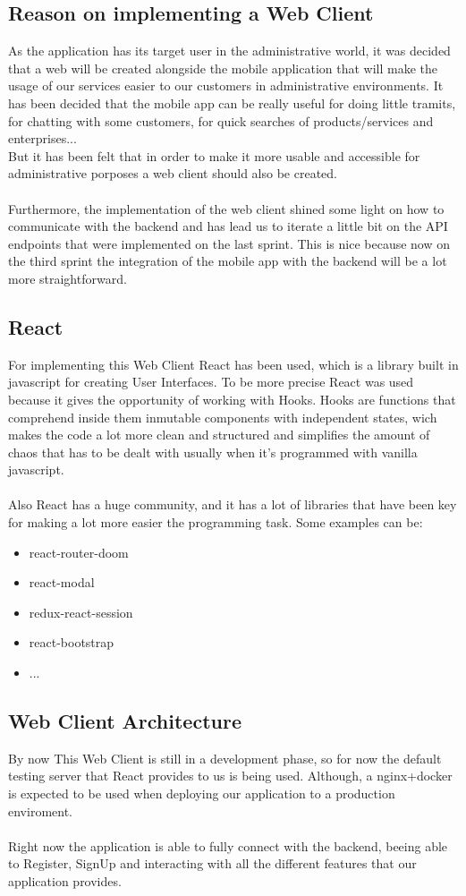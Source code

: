 \documentclass[./main.tex]{subfiles}
\begin{document}
\subsection{Reason on implementing a Web Client}
As the application has its target user in the 
administrative world, it was decided that 
a web will be created alongside the mobile application that will
make the usage of our services easier to our customers
in administrative environments. It has been decided that the 
mobile app can be really useful for doing little 
tramits, for chatting with some customers, for 
quick searches of products/services and enterprises...\\
But it has been felt that in order to make it more usable and
accessible for administrative porposes a web client
should also be created.
\\\\
Furthermore, the implementation of the web client 
shined some light on how to communicate with the backend
and has lead us to iterate a little bit on the API endpoints
that were implemented on the last sprint. This is nice because now
on the third sprint the integration of the mobile app with the 
backend will be a lot more straightforward.
\subsection{React}
For implementing this Web Client React has been used, which is a 
library built in javascript for creating User Interfaces. 
To be more precise React was used because it gives the opportunity
of working with Hooks. Hooks are functions that comprehend inside them inmutable
components with independent states, wich makes the code a lot more
clean and structured and simplifies the amount of chaos that has
to be dealt with usually when it's programmed with vanilla javascript.
\\\\
Also React has a huge community, and it has a lot of libraries that
have been key for making a lot more easier the programming task.
Some examples can be:
\begin{itemize}
	\item react-router-doom
	\item react-modal
	\item redux-react-session
	\item react-bootstrap
	\item ...
\end{itemize}
\subsection{Web Client Architecture}
By now This Web Client is still in a development phase, so for 
now the default testing server that React provides to us is being used.
Although, a nginx+docker is expected to be used when deploying our application
to a production enviroment.
\\\\
Right now the application is able to fully connect with the backend,
beeing able to Register, SignUp and interacting with all the different 
features that our application provides.
\end{document}
